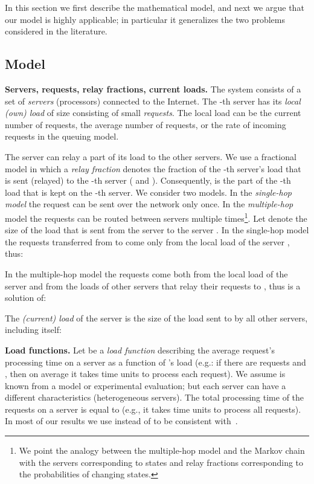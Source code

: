 \documentclass[11pt]{article}
\begin{document}
In this section we first describe the mathematical model, and next we argue that our model is highly applicable; in particular it generalizes the two problems considered in the literature.

\subsection{Model}\label{sec:mathematical-model}

\noindent
\textbf{Servers, requests, relay fractions, current loads.}\quad
The system consists of a set of  \emph{servers} (processors) connected to the Internet. The -th server has its \emph{local (own) load} of size  
consisting of small \emph{requests}. The local load can be the current number of requests, the average number of requests, or the rate of incoming requests in the queuing model.

The server can relay a part of its load to the other servers. We use a fractional model in which a \emph{relay fraction}  denotes the fraction of the -th server's load that is sent (relayed) to the -th server ( and ). Consequently,  is the part of the -th load that is kept on the -th server. We consider two models. In the \emph{single-hop model} the request can be sent over the network only once. In the \emph{multiple-hop} model the requests can be routed between servers multiple times\footnote{We point the analogy between the multiple-hop model and the Markov chain with the servers corresponding to states and relay fractions  corresponding to the probabilities of changing states.}. Let  denote the size of the load that is sent from the server  to the server . In the single-hop model the requests transferred from  to  come only from the local load of the server , thus:

In the multiple-hop model the requests come both from the local load of the server  and from the loads of other servers that relay their requests to , thus  is a solution of:

The \emph{(current) load} of the server  is the size of the load sent to  by all other servers, including  itself:

\medskip

\noindent
\textbf{Load functions.}\quad
Let  be a \emph{load function} describing the average request's processing time on a server  as a function of 's load  (e.g.: if there are  requests and , then on average it takes  time units to process each request). We assume  is known from a model or experimental evaluation; but each server can have a different characteristics  (heterogeneous servers).
The total processing time of the requests on a server  is equal to  (e.g., it takes  time units to process all requests). 
In most of our results we use  instead of  to be consistent with~\cite{Liu:2011:GGL:1993744.1993767}.
\end{document}
